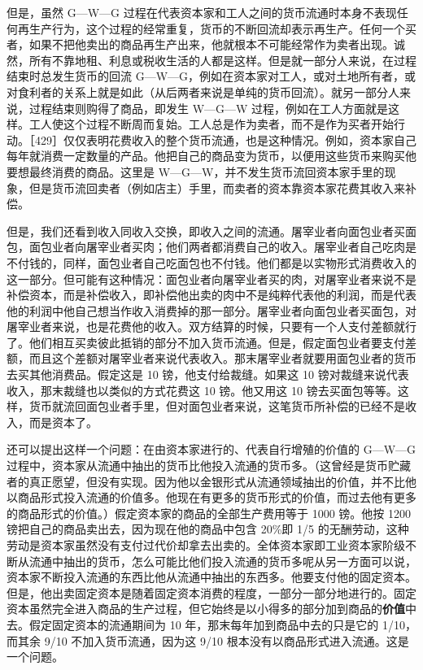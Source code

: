 但是，虽然 G—W—G 过程在代表资本家和工人之间的货币流通时本身不表现任何再生产行为，这个过程的经常重复，货币的不断回流却表示再生产。任何一个买者，如果不把他卖出的商品再生产出来，他就根本不可能经常作为卖者出现。诚然，所有不靠地租、利息或税收生活的人都是这样。但是就一部分人来说，在过程结束时总发生货币的回流 G—W—G，例如在资本家对工人，或对土地所有者，或对食利者的关系上就是如此（从后两者来说是单纯的货币回流）。就另一部分人来说，过程结束则购得了商品，即发生 W—G—W 过程，例如在工人方面就是这样。工人使这个过程不断周而复始。工人总是作为卖者，而不是作为买者开始行动。［429］仅仅表明花费收入的整个货币流通，也是这种情况。例如，资本家自己每年就消费一定数量的产品。他把自己的商品变为货币，以便用这些货币来购买他要想最终消费的商品。这里是 W—G—W，并不发生货币流回资本家手里的现象，但是货币流回卖者（例如店主）手里，而卖者的资本靠资本家花费其收入来补偿。

但是，我们还看到收入同收入交换，即收入之间的流通。屠宰业者向面包业者买面包，面包业者向屠宰业者买肉；他们两者都消费自己的收入。屠宰业者自己吃肉是不付钱的，同样，面包业者自己吃面包也不付钱。他们都是以实物形式消费收入的这一部分。但可能有这种情况：面包业者向屠宰业者买的肉，对屠宰业者来说不是补偿资本，而是补偿收入，即补偿他出卖的肉中不是纯粹代表他的利润，而是代表他的利润中他自己想当作收入消费掉的那一部分。屠宰业者向面包业者买面包，对屠宰业者来说，也是花费他的收入。双方结算的时候，只要有一个人支付差额就行了。他们相互买卖彼此抵销的部分不加入货币流通。但是，假定面包业者要支付差额，而且这个差额对屠宰业者来说代表收入。那末屠宰业者就要用面包业者的货币去买其他消费品。假定这是 10 镑，他支付给裁缝。如果这 10 镑对裁缝来说代表收入，那末裁缝也以类似的方式花费这 10 镑。他又用这 10 镑去买面包等等。这样，货币就流回面包业者手里，但对面包业者来说，这笔货币所补偿的已经不是收入，而是资本了。

还可以提出这样一个问题：在由资本家进行的、代表自行增殖的价值的 G—W—G 过程中，资本家从流通中抽出的货币比他投入流通的货币多。（这曾经是货币贮藏者的真正愿望，但没有实现。因为他以金银形式从流通领域抽出的价值，并不比他以商品形式投入流通的价值多。他现在有更多的货币形式的价值，而过去他有更多的商品形式的价值。）假定资本家的商品的全部生产费用等于 1000 镑。他按 1200 镑把自己的商品卖出去，因为现在他的商品中包含 20\%即 1/5 的无酬劳动，这种劳动是资本家虽然没有支付过代价却拿去出卖的。全体资本家即工业资本家阶级不断从流通中抽出的货币，怎么可能比他们投入流通的货币多呢从另一方面可以说，资本家不断投入流通的东西比他从流通中抽出的东西多。他要支付他的固定资本。但是，他出卖固定资本是随着固定资本消费的程度，一部分一部分地进行的。固定资本虽然完全进入商品的生产过程，但它始终是以小得多的部分加到商品的\textbf{价值}中去。假定固定资本的流通期间为 10 年，那末每年加到商品中去的只是它的 1/10，而其余 9/10 不加入货币流通，因为这 9/10 根本没有以商品形式进入流通。这是一个问题。

